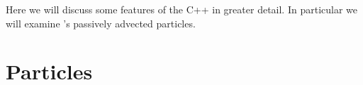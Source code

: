 Here we will discuss some features of the C++ in greater detail. In 
particular we will examine \BoxLib's passively advected particles.

\section{Particles}
